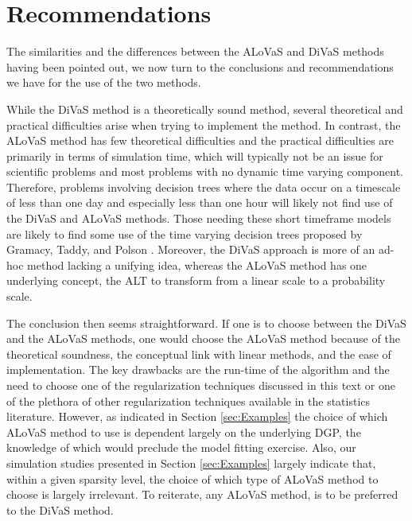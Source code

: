 \section{Recommendations}

The similarities and the differences between the ALoVaS and DiVaS methods having been pointed out, we now turn to the conclusions and recommendations we have for the use of the two methods. 

While the DiVaS method is a theoretically sound method, several theoretical and practical difficulties arise when trying to implement the method. In contrast, the ALoVaS method has few theoretical difficulties and the practical difficulties are primarily in terms of simulation time, which will typically not be an issue for scientific problems and most problems with no dynamic time varying component. Therefore, problems involving decision trees where the data occur on a timescale of less than one day and especially less than one hour will likely not find use of the DiVaS and ALoVaS methods. Those needing these short timeframe models are likely to find some use of the time varying decision trees proposed by Gramacy, Taddy, and Polson \cite{taddy2011dynamic}. Moreover, the DiVaS approach is more of an ad-hoc method lacking a unifying idea, whereas the ALoVaS method has one underlying concept, the ALT to transform from a linear scale to a probability scale. 

The conclusion then seems straightforward. If one is to choose between the DiVaS and the ALoVaS methods, one would choose the ALoVaS method because of the  theoretical soundness, the conceptual link with linear methods, and the ease of implementation. The key drawbacks are the run-time of the algorithm and the need to choose one of the regularization techniques discussed in this text or one of the plethora of other regularization techniques available in the statistics literature. However, as indicated in Section \ref{sec:Examples}  the choice of which ALoVaS method to use is dependent largely on the underlying DGP, the knowledge of which would preclude the model fitting exercise. Also, our simulation studies presented in Section \ref{sec:Examples} largely indicate that, within a given sparsity level, the choice of which type of ALoVaS method to choose is largely irrelevant. To reiterate, any ALoVaS method, is to be preferred to the DiVaS method. 

